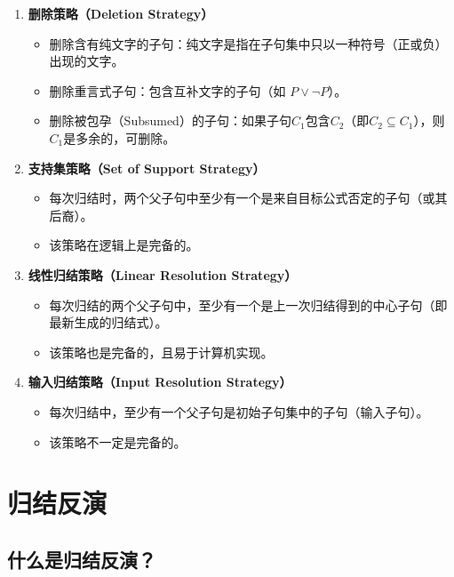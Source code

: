 \begin{enumerate}[leftmargin=2em,itemsep=0pt]
    \item \textbf{删除策略（Deletion Strategy）}
    \begin{itemize}
        \item 删除含有纯文字的子句：纯文字是指在子句集中只以一种符号（正或负）出现的文字。
        \item 删除重言式子句：包含互补文字的子句（如 $P \lor \neg P$）。
        \item 删除被包孕（Subsumed）的子句：如果子句$C_1$包含$C_2$（即$C_2 \subseteq C_1$），则$C_1$是多余的，可删除。
    \end{itemize}
    
    \item \textbf{支持集策略（Set of Support Strategy）}
    \begin{itemize}
        \item 每次归结时，两个父子句中至少有一个是来自目标公式否定的子句（或其后裔）。
        \item 该策略在逻辑上是完备的。
    \end{itemize}
    
    \item \textbf{线性归结策略（Linear Resolution Strategy）}
    \begin{itemize}
        \item 每次归结的两个父子句中，至少有一个是上一次归结得到的中心子句（即最新生成的归结式）。
        \item 该策略也是完备的，且易于计算机实现。
    \end{itemize}
    
    \item \textbf{输入归结策略（Input Resolution Strategy）}
    \begin{itemize}
        \item 每次归结中，至少有一个父子句是初始子句集中的子句（输入子句）。
        \item 该策略不一定是完备的。
    \end{itemize}
\end{enumerate}

\section{归结反演}

\subsection{什么是归结反演？}

